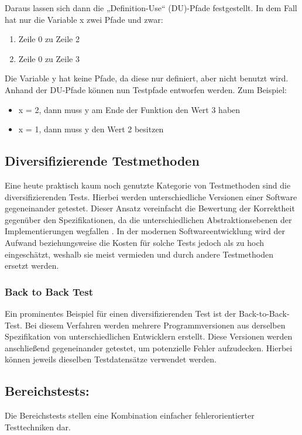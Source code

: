 \documentclass[	%
		fontsize=11pt,  %
		a4paper,	    %
		ngerman,		%
		sans,			%
		f4,				%
	]{HsH-report}		%
\begin{document}
Daraus lassen sich dann die „Definition-Use“ (DU)-Pfade festgestellt. In dem
Fall hat nur die Variable x zwei Pfade und zwar:

\begin{enumerate}
	\item Zeile 0 zu Zeile 2
	\item Zeile 0 zu Zeile 3
\end{enumerate}

Die Variable y hat keine Pfade, da diese nur definiert, aber nicht benutzt
wird. Anhand der DU-Pfade können nun Testpfade entworfen werden. Zum Beispiel:

\begin{itemize}
	\item x = 2, dann muss y am Ende der Funktion den Wert 3 haben
	\item x = 1, dann muss y den Wert 2 besitzen
\end{itemize}

\subsection{Diversifizierende Testmethoden}
Eine heute praktisch kaum noch genutzte Kategorie von Testmethoden sind die
diversifizierenden Tests. Hierbei werden unterschiedliche Versionen einer
Software gegeneinander getestet. Dieser Ansatz vereinfacht die Bewertung der
Korrektheit gegenüber den Spezifikationen, da die unterschiedlichen
Abstraktionsebenen der Implementierungen wegfallen
\cite{liggesmeyer:qualitaet}. In der modernen Softwareentwicklung wird der
Aufwand beziehungsweise die Kosten für solche Tests jedoch als zu hoch
eingeschätzt, weshalb sie meist vermieden und durch andere Testmethoden ersetzt
werden.

\subsubsection{Back to Back Test}
Ein prominentes Beispiel für einen diversifizierenden Test ist der
Back-to-Back-Test. Bei diesem Verfahren werden mehrere Programmversionen aus
derselben Spezifikation von unterschiedlichen Entwicklern erstellt. Diese
Versionen werden anschließend gegeneinander getestet, um potenzielle Fehler
aufzudecken. Hierbei können jeweils dieselben Testdatensätze verwendet werden.
\cite{liggesmeyer:qualitaet}

\subsection{Bereichstests:}
Die Bereichstests stellen eine Kombination einfacher fehlerorientierter
Testtechniken dar. \cite{liggesmeyer:qualitaet}
\end{document}

